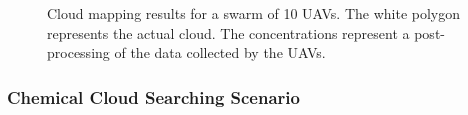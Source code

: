 \begin{figure}[ht]
	\centering
	\vfill
	\begin{minipage}{\textwidth}
		\hfill
		\hfill
		\hfill
	\end{minipage}
	\vfill

\caption[Cloud mapping results for a swarm of 10 UAVs.]{Cloud mapping results for a swarm of 10 UAVs.  The white polygon represents the actual cloud.  The concentrations represent a post-processing of the data collected by the UAVs.}
\label{fig:CloudMap}
\end{figure}


\subsubsection{Chemical Cloud Searching Scenario}

